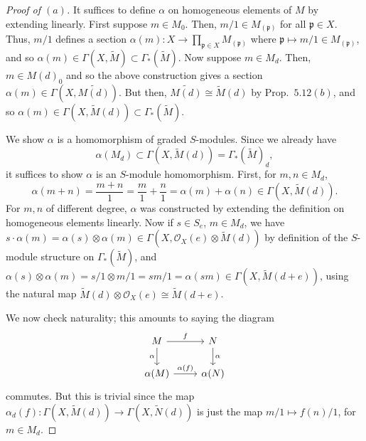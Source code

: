 \documentclass[10pt]{article}
\theoremstyle{definition}
\theoremstyle{remark}
\numberwithin{equation}{section}
\numberwithin{figure}{subsubsection}
\newcommand{\OO}{\mathcal{O}}
\begin{document}
\begin{proof}[Proof of $(a)$]
  It suffices to define $\alpha$ on homogeneous elements of $M$ by extending linearly. First suppose $m \in M_0$. Then, $m/1 \in M_{(\mathfrak{p})}$ for all $\mathfrak{p} \in X$. Thus, $m/1$ defines a section $\alpha(m)\colon X \to \prod_{\mathfrak{p}\in X} M_{(\mathfrak{p})}$ where $\mathfrak{p} \mapsto m/1 \in M_{(\mathfrak{p})}$, and so $\alpha(m) \in \Gamma(X,\tilde{M}) \subset \Gamma_*(\tilde{M})$. Now suppose $m \in M_d$. Then, $m \in M(d)_0$ and so the above construction gives a section $\alpha(m) \in \Gamma(X,\widetilde{M(d)})$. But then, $\widetilde{M(d)} \cong \tilde{M}(d)$ by Prop.~$5.12(b)$, and so $\alpha(m) \in \Gamma(X,\tilde{M}(d)) \subset \Gamma_*(\tilde{M})$.
  \par We show $\alpha$ is a homomorphism of graded $S$-modules. Since we already have
  \begin{equation*}
    \alpha(M_d) \subset \Gamma(X,\tilde{M}(d)) = \Gamma_*(\tilde{M})_d,
  \end{equation*}
  it suffices to show $\alpha$ is an $S$-module homomorphism. First, for $m,n \in M_d$,
  \begin{equation*}
    \alpha(m+n) = \frac{m+n}{1} = \frac{m}{1} + \frac{n}{1} = \alpha(m) + \alpha(n) \in \Gamma(X,\tilde{M}(d)).
  \end{equation*}
  For $m,n$ of different degree, $\alpha$ was constructed by extending the definition on ho\-mo\-ge\-neous elements linearly. Now if $s \in S_e$, $m \in M_d$, we have $s \cdot \alpha(m) = \alpha(s) \otimes \alpha(m) \in \Gamma(X,\OO_X(e) \otimes \tilde{M}(d))$ by definition of the $S$-module structure on $\Gamma_*(\tilde{M})$, and $\alpha(s) \otimes \alpha(m) = s/1 \otimes m/1 = sm/1 = \alpha(sm) \in \Gamma(X,\tilde{M}(d+e))$, using the natural map $\tilde{M}(d) \otimes \OO_X(e) \cong \tilde{M}(d+e)$.
  \par We now check naturality; this amounts to saying the diagram
  \begin{equation}\label{alphnattrans}
    \begin{tikzcd}
      M \rar{f}\dar[swap]{\alpha} & N\dar{\alpha}\\
      \alpha(M) \rar{\alpha(f)} & \alpha(N)
    \end{tikzcd}
  \end{equation}
  commutes. But this is trivial since the map $\alpha_d(f)\colon \Gamma(X,\tilde{M}(d)) \to \Gamma(X,\tilde{N}(d))$ is just the map $m/1 \mapsto f(n)/1$, for $m \in M_d$.
\end{proof}
\end{document}
